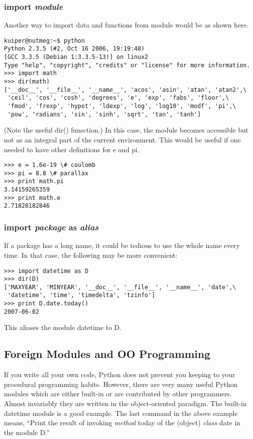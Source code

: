 \documentclass{article}
\begin{document}
\subsubsection{{\ttfamily import {\itshape module}}}

Another way to import data and functions from module would be as shown
here.
{\small \begin{verbatim}
kuiper@nutmeg:~$ python
Python 2.3.5 (#2, Oct 16 2006, 19:19:48)
[GCC 3.3.5 (Debian 1:3.3.5-13)] on linux2
Type "help", "copyright", "credits" or "license" for more information.
>>> import math
>>> dir(math)
['__doc__', '__file__', '__name__', 'acos', 'asin', 'atan', 'atan2',\
 'ceil', 'cos', 'cosh', 'degrees', 'e', 'exp', 'fabs', 'floor',\
 'fmod', 'frexp', 'hypot', 'ldexp', 'log', 'log10', 'modf', 'pi',\
 'pow', 'radians', 'sin', 'sinh', 'sqrt', 'tan', 'tanh']
\end{verbatim}}
(Note the useful {\ttfamily dir()} funsction.)
In this case, the module becomes accessible but not as an integral part of the
current environment. 
  This would be useful if one needed to have other
definitions for {\ttfamily e} and {\ttfamily pi}.
\begin{verbatim}
>>> e = 1.6e-19 \# coulomb
>>> pi = 8.8 \# parallax
>>> print math.pi
3.14159265359
>>> print math.e
2.71828182846
\end{verbatim}

\subsubsection{{\ttfamily}import {\itshape package} as {\itshape alias}}

If a package has a long name, it could be tedious to use the whole name every time.
In that case, the following may be more convenient:
\begin{verbatim}
>>> import datetime as D
>>> dir(D)
['MAXYEAR', 'MINYEAR', '__doc__', '__file__', '__name__', 'date',\
 'datetime', 'time', 'timedelta', 'tzinfo']
>>> print D.date.today()
2007-06-02
\end{verbatim}
This aliases the module {\ttfamily datetime} to {\ttfamily D}.

\subsection{Foreign Modules and OO Programming}

If you write all your own code, Python does not prevent you keeping to your
procedural programming habits.  However, there are very many useful Python
modules which are either built-in or are contributed by other programmers.
Almost invariably they are written in the object-oriented paradigm. The built-in
{\ttfamily datetime} module is a good example.  The last command in the
above example means, ``Print the result of invoking {\itshape method}
{\ttfamily today} of the (object) {\itshape class} {\ttfamily date} in the
module {\ttfamily D}.''
\end{document}
